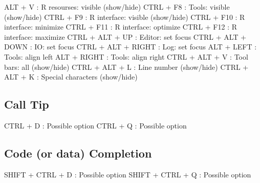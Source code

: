 \vspace{-0.5cm}
\begin{Rtables}[caption={[View menu keyboard shortcuts]
    View menu keyboard shortcuts},
  label=menu:view]
  ALT  + V                : R resourses: visible (show/hide)
  CTRL + F8               : Tools: visible (show/hide)
  CTRL + F9               : R interface: visible (show/hide)
  CTRL + F10              : R interface: minimize
  CTRL + F11              : R interface: optimize
  CTRL + F12              : R interface: maximize
  CTRL + ALT + UP         : Editor: set focus
  CTRL + ALT + DOWN       : IO: set focus
  CTRL + ALT + RIGHT      : Log: set focus
  ALT  + LEFT             : Tools: align left
  ALT  + RIGHT            : Tools: align right
  CTRL + ALT + V          : Tool bars: all (show/hide)
  CTRL + ALT + L          : Line number (show/hide)
  CTRL + ALT + K          : Special characters (show/hide)
\end{Rtables}


\hypertarget{basic_card_calltip}{}
\subsection{Call Tip}

\vspace{-0.5cm}
\begin{Rtables}[caption={[Call tip keyboard shortcuts]
    Call tip keyboard shortcuts},
  label=shortcut:calltip]
  CTRL + D                : Possible option
  CTRL + Q                : Possible option
\end{Rtables}


\hypertarget{basic_card_codecompletion}{}
\subsection{Code (or data) Completion}

\vspace{-0.5cm}
\begin{Rtables}[caption={[Code completion keyboard shortcuts]
    Code completion keyboard shortcuts},
  label=shortcut:codecompletion]
  SHIFT + CTRL + D        : Possible option
  SHIFT + CTRL + Q        : Possible option
\end{Rtables}


